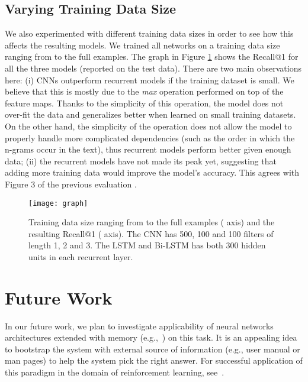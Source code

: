 \documentclass{article} \usepackage{nips15submit_e,times}
\newcommand{\MARTINSECOND}[1]{{\color{black}#1}} \newcommand{\MARTINTHIRD}[1]{{\color{black}#1}} \newcommand{\COPY}[1]{{\color{black}[#1]}}
\begin{document}
\subsection{Varying Training Data Size}
\MARTINSECOND{
We also experimented with different training data sizes in order to see how this affects the resulting models.
We trained all networks on a training data size ranging from  to the full  examples.
The graph in Figure \ref{fig-graph} shows the Recall@1 for all the three models (reported on the test data).
There are two main observations here: 
(i) CNNs outperform recurrent models if the training dataset is small.
We believe that this is mostly due to the \textit{max} operation performed on top of the feature maps.
Thanks to the simplicity of this operation, the model does not over-fit the data and generalizes better when learned on small training datasets.
On the other hand, the simplicity of the operation does not allow the model to properly handle more complicated dependencies 
(such as the order in which the n-grams occur in the text), thus recurrent models perform better given enough data;
(ii) the recurrent models have not made its peak yet, suggesting that adding more training data would improve the model's accuracy.
This agrees with Figure 3 of the previous evaluation \cite{lowe2015ubuntu}.
}

\begin{figure}[h!]
  \centering
  \texttt{[image: graph]}
  \caption   
  {
  Training data size ranging from  to the full  examples ( axis) and the resulting
  Recall@1 ( axis). The CNN has 500, 100 and 100 filters of length 1, 2 and 3. The LSTM and Bi-LSTM has both 300 hidden units in each recurrent layer.
  }
  \label{fig-graph}
\end{figure}








\section{Future Work}
In our future work, we plan to investigate applicability of neural networks architectures extended with memory (e.g.,~\cite{Graves2014,Sukhbaatar2015,Joulin2015}) on this task.
It is an appealing idea to bootstrap the system with external source of information (e.g., user manual or man pages)
to help the system pick the right answer. For successful application of this paradigm in the domain of reinforcement learning, see~\cite{Branavan2012}.
\end{document}

